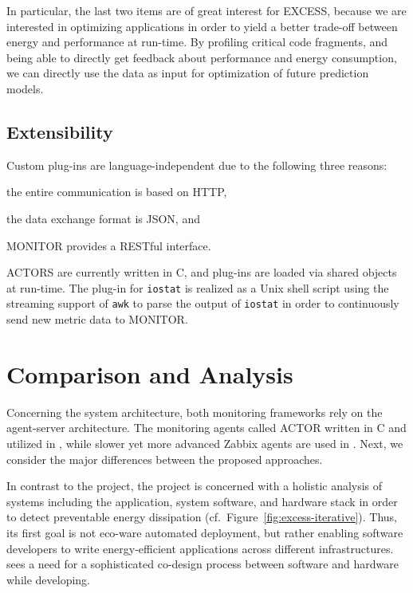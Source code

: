 \documentclass[10pt,letterpaper]{IEEEtran}
\begin{document}
In particular, the last two items are of great interest for EXCESS, because we are interested in optimizing
applications in order to yield a better trade-off between energy and performance at run-time. By profiling
critical code fragments, and being able to directly get feedback about performance and energy consumption,
we can directly use the data as input for optimization of future prediction models.

\subsection{Extensibility}
Custom plug-ins are language-independent due to the following three reasons:
\begin{enumerate*}[label=\itshape\alph*\upshape)]
\item the entire communication is based on HTTP,
\item the data exchange format is JSON, and
\item MONITOR provides a RESTful interface.
\end{enumerate*}
ACTORS are currently written in C, and plug-ins are loaded via shared objects at run-time. The plug-in
for \texttt{iostat} is realized as a Unix shell script using the streaming support of \texttt{awk} to
parse the output of \texttt{iostat} in order to continuously send new metric data to MONITOR.

 \section{Comparison and Analysis}
\label{sec:comparison}

\noindent



Concerning the system architecture, both monitoring frameworks rely on the agent-server architecture.
The monitoring agents called
ACTOR written in C and utilized in \EXCESS, while slower yet more advanced Zabbix agents are used in \ECO.
Next, we consider the major differences between the proposed approaches.

In contrast to the \ECO project, the \EXCESS project is
concerned with a holistic analysis of systems including the application, system software, and hardware
stack in order to detect preventable energy dissipation (cf.~Figure~\ref{fig:excess-iterative}). Thus,
its first goal is not eco-ware automated deployment, but rather enabling software developers to write
energy-efficient applications across different infrastructures. \EXCESS sees a need for a sophisticated
co-design process between software and hardware while developing. 
\end{document}
